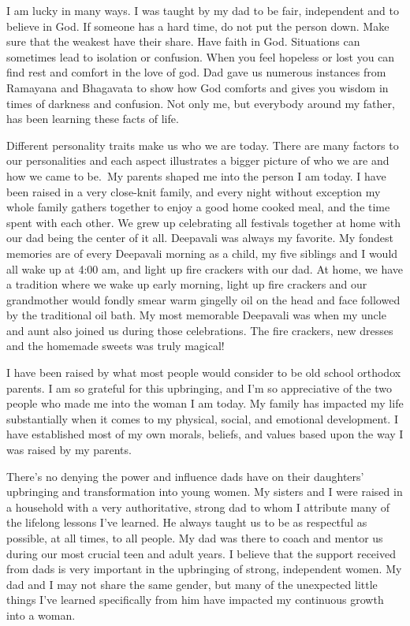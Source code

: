 I am lucky in many ways. I was taught by my dad to be fair, independent and to believe in God. If someone has a hard time, do not put the person down. Make sure that the weakest have their share. Have faith in God. Situations can sometimes lead to isolation or confusion. When you feel hopeless or lost you can find rest and comfort in the love of god. Dad gave us numerous instances from Ramayana and Bhagavata to show how God comforts and gives you wisdom in times of darkness and confusion. Not only me, but everybody around my father, has been learning these facts of life.

Different personality traits make us who we are today. There are many factors to our personalities and each aspect illustrates a bigger picture of who we are and how we came to be. My parents shaped me into the person I am today. I have been raised in a very close-knit family, and every night without exception my whole family gathers together to enjoy a good home cooked meal, and the time spent with each other. We grew up celebrating all festivals together at home with our dad being the center of it all. Deepavali was always my favorite. My fondest memories are of every Deepavali morning as a child, my five siblings and I would all wake up at 4:00 am, and light up fire crackers with our dad. At home, we have a tradition where we wake up early morning, light up fire crackers and our grandmother would fondly smear warm gingelly oil on the head and face followed by the traditional oil bath. My most memorable Deepavali was when my uncle and aunt also joined us during those celebrations. The fire crackers, new dresses and the homemade sweets was truly magical! 

I have been raised by what most people would consider to be old school orthodox parents. I am so grateful for this upbringing, and I'm so appreciative of the two people who made me into the woman I am today. My family has impacted my life substantially when it comes to my physical, social, and emotional development. I have established most of my own morals, beliefs, and values based upon the way I was raised by my parents.

There’s no denying the power and influence dads have on their daughters’ upbringing and transformation into young women. My sisters and I were raised in a household with a very authoritative, strong dad to whom I attribute many of the lifelong lessons I’ve learned. He always taught us to be as respectful as possible, at all times, to all people. My dad was there to coach and mentor us during our most crucial teen and adult years. I believe that the support received from dads is very important in the upbringing of strong, independent women. My dad and I may not share the same gender, but many of the unexpected little things I've learned specifically from him have impacted my continuous growth into a woman.

